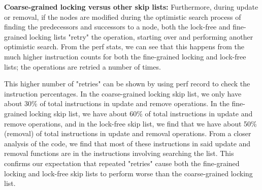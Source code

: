 \documentclass[11pt]{article}
\begin{document}
\textbf{Coarse-grained locking versus other skip lists:} Furthermore, during update or removal, if the nodes are modified during the optimistic search process of finding the predecessors and successors to a node, both the lock-free and fine-grained locking lists "retry" the operation, starting over and performing another optimistic search. From the perf stats, we can see that this happens from the much higher instruction counts for both the fine-grained locking and lock-free lists; the operations are retried a number of times.

This higher number of "retries" can be shown by using perf record to check the instruction percentages. In the coarse-grained locking skip list, we only have about 30\% of total instructions in update and remove operations. In the fine-grained locking skip list, we have about 60\% of total instructions in update and remove operations, and in the lock-free skip list, we find that we have about 50\% (removal) of total instructions in update and removal operations. From a closer analysis of the code, we find that most of these instructions in said update and removal functions are in the instructions involving searching the list. This confirms our expectation that repeated "retries" cause both the fine-grained locking and lock-free skip lists to perform worse than the coarse-grained locking list. 
\end{document}
